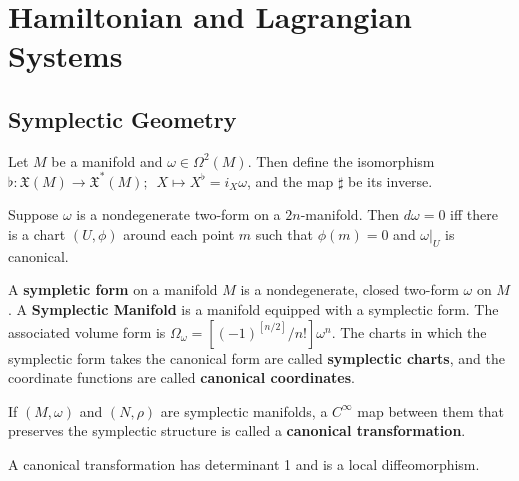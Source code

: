 
\section{Hamiltonian and Lagrangian Systems}

\subsection{Symplectic Geometry}

\begin{defn}

Let $M$ be a manifold and $\omega \in \Omega^2(M) $. Then define the isomorphism $ \flat: \mathfrak{X}(M) \to \mathfrak{X}^* (M); \hspace{6pt} X \mapsto X^{\flat} = i_X \omega$, and the map $\sharp$ be its inverse.

\end{defn}
\begin{thm}[Darboux]
Suppose $\omega$ is a nondegenerate two-form on a $2n$-manifold. Then $d\omega = 0$ iff there is a chart $(U, \phi)$ around each point $m$ such that $\phi(m) = 0$ and $\omega\vert_U$ is canonical.
\end{thm}

\begin{defn}
A \textbf{sympletic form} on a manifold $M$ is a nondegenerate, closed two-form $\omega$ on $M$. A \textbf{Symplectic Manifold} is a manifold equipped with a symplectic form. The associated volume form is $\Omega_{\omega} = [(-1)^{[n/2]}/n!]\omega^n$. The charts in which the symplectic form takes the canonical form are called \textbf{symplectic charts}, and the coordinate functions are called \textbf{canonical coordinates}.
\end{defn}

\begin{defn}

If $(M,\omega)$ and $(N, \rho)$ are symplectic manifolds, a $C^{\infty}$ map between them that preserves the symplectic structure is called a \textbf{canonical transformation}.

\end{defn}

\begin{prop}

A canonical transformation has determinant 1 and is a local diffeomorphism.

\end{prop}

